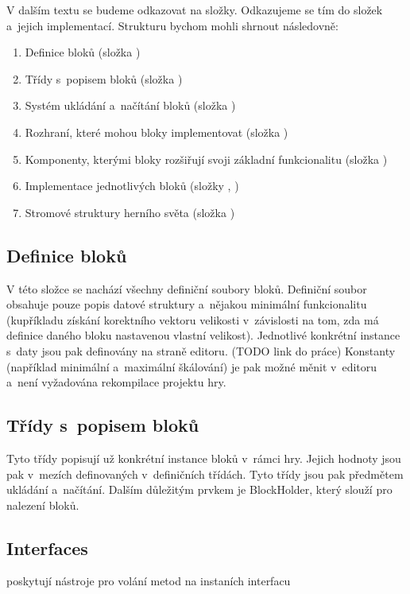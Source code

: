 V dalším textu se budeme odkazovat na složky. Odkazujeme se tím do složek  a~jejich  implementací. Strukturu bychom mohli shrnout následovně:

\begin{enumerate}
	\item Definice bloků (složka )
	\item Třídy s~popisem bloků (složka )
	\item Systém ukládání a~načítání bloků (složka )
	\item Rozhraní, které mohou bloky implementovat (složka )
	\item Komponenty, kterými bloky rozšiřují svoji základní funkcionalitu (složka )
	\item Implementace jednotlivých bloků (složky , )
	\item Stromové struktury herního světa (složka )
\end{enumerate}
 

\subsection{Definice bloků}
V této složce se nachází všechny definiční soubory bloků. Definiční soubor obsahuje pouze popis datové struktury a~nějakou minimální funkcionalitu (kupříkladu získání korektního vektoru velikosti v~závislosti na tom, zda má definice daného bloku nastavenou vlastní velikost). Jednotlivé konkrétní instance s~daty jsou pak definovány na straně editoru. (TODO link do práce) Konstanty (například minimální a~maximální škálování) je pak možné měnit v~editoru a~není vyžadována rekompilace projektu hry. 


\subsection{Třídy s~popisem bloků}
Tyto třídy popisují už konkrétní instance bloků v~rámci hry. Jejich hodnoty jsou pak v~mezích definovaných v~definičních třídách. Tyto třídy jsou pak předmětem ukládání a~načítání. Dalším důležitým prvkem je BlockHolder, který slouží pro nalezení bloků. 



\subsection{Interfaces}
poskytují nástroje pro volání metod na instaních interfacu

